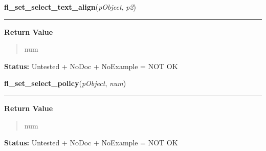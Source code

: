     \label{xformslib:library:fl_set_select_text_align}

    \vspace{0.5ex}

\hspace{.8\funcindent}\begin{boxedminipage}{\funcwidth}

    \raggedright \textbf{fl\_set\_select\_text\_align}(\textit{pObject}, \textit{p2})

    \vspace{-1.5ex}

    \rule{\textwidth}{0.5\fboxrule}
\setlength{\parskip}{2ex}
\setlength{\parskip}{1ex}
      \textbf{Return Value}
    \vspace{-1ex}

      \begin{quote}
      num

      \end{quote}

\textbf{Status:} Untested + NoDoc + NoExample = NOT OK



    \end{boxedminipage}

    \label{xformslib:library:fl_set_select_policy}

    \vspace{0.5ex}

\hspace{.8\funcindent}\begin{boxedminipage}{\funcwidth}

    \raggedright \textbf{fl\_set\_select\_policy}(\textit{pObject}, \textit{num})

    \vspace{-1.5ex}

    \rule{\textwidth}{0.5\fboxrule}
\setlength{\parskip}{2ex}
\setlength{\parskip}{1ex}
      \textbf{Return Value}
    \vspace{-1ex}

      \begin{quote}
      num

      \end{quote}

\textbf{Status:} Untested + NoDoc + NoExample = NOT OK



    \end{boxedminipage}

